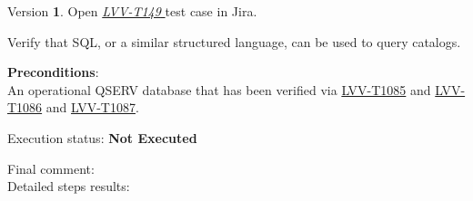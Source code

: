 \documentclass[DM,lsstdraft,STR,toc]{lsstdoc}
\begin{document}
Version \textbf{1}.
Open  \href{https://jira.lsstcorp.org/secure/Tests.jspa#/testCase/LVV-T149}{\textit{ LVV-T149 } }
test case in Jira.

Verify that SQL, or a similar structured language, can be used to query
catalogs.

\textbf{ Preconditions}:\\
An operational QSERV database that has been verified via
\href{https://jira.lsstcorp.org/secure/Tests.jspa\#/testCase/LVV-T1085}{LVV-T1085}
and
\href{https://jira.lsstcorp.org/secure/Tests.jspa\#/testCase/LVV-T1086}{LVV-T1086}
and
\href{https://jira.lsstcorp.org/secure/Tests.jspa\#/testCase/LVV-T1087}{LVV-T1087}.

Execution status: {\bf Not Executed }

Final comment:\\


Detailed steps results:
\end{document}
